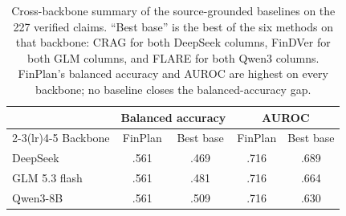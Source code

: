 \documentclass[11pt]{article}
\begin{document}
\begin{table}[t]
\centering
\scriptsize
\setlength{\tabcolsep}{3pt}
\begin{tabular}{lcccc}
\toprule
 & \multicolumn{2}{c}{Balanced accuracy} & \multicolumn{2}{c}{AUROC} \\
\cmidrule(lr){2-3}\cmidrule(lr){4-5}
Backbone & FinPlan & Best base & FinPlan & Best base \\
\midrule
DeepSeek & .561 & .469 & .716 & .689 \\
GLM 5.3 flash & .561 & .481 & .716 & .664 \\
Qwen3-8B & .561 & .509 & .716 & .630 \\
\bottomrule
\end{tabular}
\caption{Cross-backbone summary of the source-grounded baselines on the 227
verified claims. ``Best base'' is the best of the six methods on that
backbone: CRAG for both DeepSeek columns, FinDVer for both GLM columns, and
FLARE for both Qwen3 columns. FinPlan's balanced accuracy and AUROC are highest
on every backbone; no baseline closes the balanced-accuracy gap.}
\label{tab:backbone-summary}
\end{table}
\end{document}
